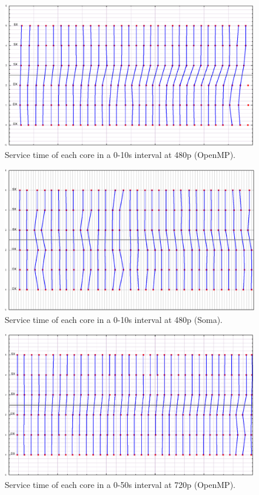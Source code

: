 \documentclass[a4paper,12pt,oneside]{book}
\begin{document}
\begin{figure}[H]
\centering
\includegraphics[scale=0.27]{omp_480_range_010.png}
\caption{Service time of each core in a 0-10s interval at 480p (OpenMP).}
\label{omp480jitter}
\end{figure}

\begin{figure}[H]
\centering
\includegraphics[scale=0.27]{soma_480_range_010.png}
\caption{Service time of each core in a 0-10s interval at 480p (Soma).}
\label{soma480jitter}
\end{figure}

\begin{figure}[H]
\centering
\includegraphics[scale=0.27]{omp_720_range_050.png}
\caption{Service time of each core in a 0-50s interval at 720p (OpenMP).}
\label{omp720jitter}
\end{figure}
\end{document}
